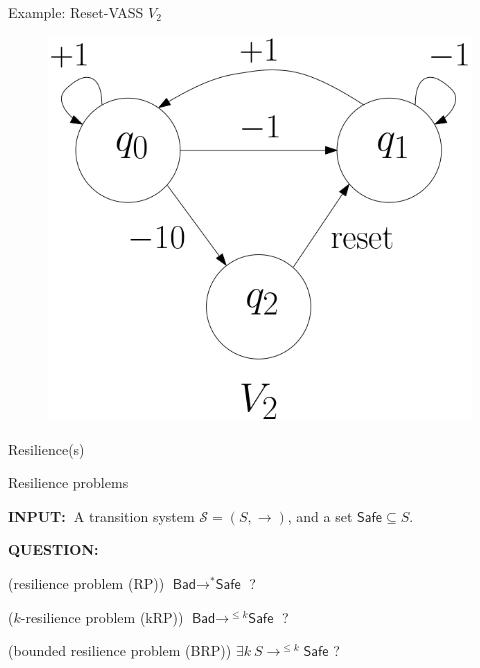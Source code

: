 \documentclass{beamer}
\newcommand{\Bad}{\textsf{Bad}}
\newcommand{\Safe}{\textsf{Safe}}
\begin{document}
  \begin{frame}{Example: Reset-VASS $V_2$}
  
  
   \begin{center}
 	\begin{figure}
\includegraphics[width=.50\textwidth]{FigB}
	\end{figure}
\end{center}  

  \end{frame}
  \begin{frame}{Resilience(s)}
  



  
 {\small
  
  
{\sc Resilience problems} 

\hspace{-0.5cm}  {\bf INPUT:\ }{A transition system $\mathscr{S}=(S,\rightarrow)$, and a set $\Safe \subseteq S$.}

\hspace{-0.5cm}  {\bf QUESTION:\ } 

\hspace{-0.5cm}  {({\sc resilience problem (RP)}) $\Bad \rightarrow^{*} \Safe$ ?

\hspace{-0.5cm}  ({\sc $k$-resilience problem (kRP)})		$\Bad \rightarrow^{\leq k} \Safe$ ?

\hspace{-0.5cm}  ({\sc bounded resilience problem (BRP)})	$\exists k ~ S \rightarrow^{\leq k} \Safe$ ?\newline}

}

  \end{frame}
\end{document}
